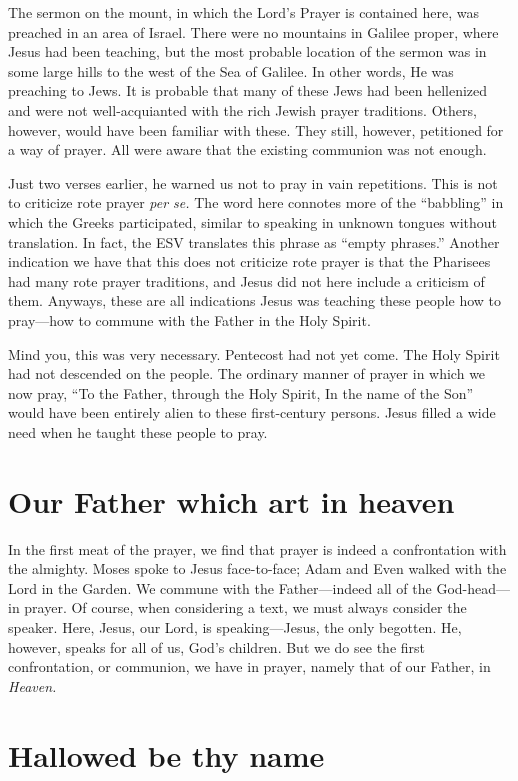 \documentclass[12pt]{article}
\begin{document}
The sermon on the mount, in which the Lord's Prayer is contained here, was preached in an area of Israel.  There were no mountains in Galilee proper, where Jesus had been teaching, but the most probable location of the sermon was in some large hills to the west of the Sea of Galilee.  In other words, He was preaching to Jews.  It is probable that many of these Jews had been hellenized and were not well-acquianted with the rich Jewish prayer traditions.  Others, however, would have been familiar with these.  They still, however, petitioned for a way of prayer.  All were aware that the existing communion was not enough.

Just two verses earlier, he warned us not to pray in vain repetitions.  This is not to criticize rote prayer \emph{per se.}  The word here connotes more of the ``babbling'' in which the Greeks participated, similar to speaking in unknown tongues without translation.  In fact, the ESV translates this phrase as ``empty phrases.''  Another indication we have that this does not criticize rote prayer is that the Pharisees had many rote prayer traditions, and Jesus did not here include a criticism of them.  Anyways, these are all indications Jesus was teaching these people how to pray---how to commune with the Father in the Holy Spirit.

Mind you, this was very necessary.  Pentecost had not yet come.  The Holy Spirit had not descended on the people.  The ordinary manner of prayer in which we now pray, ``To the Father, through the Holy Spirit, In the name of the Son'' would have been entirely alien to these first-century persons.  Jesus filled a wide need when he taught these people to pray.

\section{Our Father which art in heaven}

In the first meat of the prayer, we find that prayer is indeed a confrontation with the almighty.  Moses spoke to Jesus face-to-face; Adam and Even walked with the Lord in the Garden.  We commune with the Father---indeed all of the God-head---in prayer.  Of course, when considering a text, we must always consider the speaker.  Here, Jesus, our Lord, is speaking---Jesus, the only begotten.  He, however, speaks for all of us, God's children.  But we do see the first confrontation, or communion, we have in prayer, namely that of our Father, in \emph{Heaven.}

\section{Hallowed be thy name}
\end{document}
